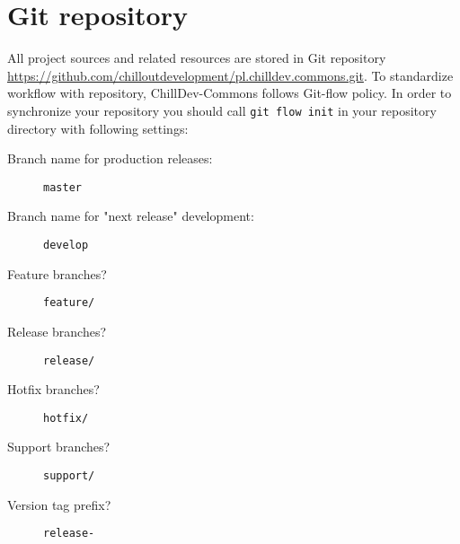 %

\section{Git repository}

All project sources and related resources are stored in Git repository \url{https://github.com/chilloutdevelopment/pl.chilldev.commons.git}. To standardize workflow with repository, ChillDev-Commons follows Git-flow policy. In order to synchronize your repository you should call \texttt{git flow init} in your repository directory with following settings:

\begin{description}
    \item[Branch name for production releases:]
    \texttt{master}

    \item[Branch name for "next release" development:]
    \texttt{develop}

    \item[Feature branches?]
    \texttt{feature/}

    \item[Release branches?]
    \texttt{release/}

    \item[Hotfix branches?]
    \texttt{hotfix/}

    \item[Support branches?]
    \texttt{support/}

    \item[Version tag prefix?]
    \texttt{release-}
\end{description}

